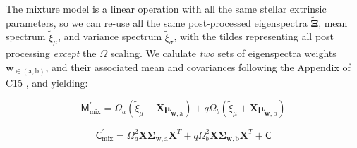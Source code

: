 \documentclass[onecolumn]{emulateapj}%
\newcommand{\iancze}{{\sc C15 }}
\begin{document}
The mixture model is a linear operation with all the same stellar extrinsic parameters, so we can re-use all the same post-processed eigenspectra $\widetilde{\mathbf{\Xi}}$, mean spectrum $\widetilde{\xi}_\mu$, and variance spectrum $\widetilde{\xi}_\sigma$, with the tildes representing all post processing \emph{except} the $\Omega$ scaling.  We calulate \emph{two} sets of eigenspectra weights $\mathbf{w}_{\in (\mathrm{a}, \mathrm{b})}$, and their associated mean and covariances following the Appendix of \iancze, and yielding:

\begin{equation}
  \mathsf{M}_{\mathrm{mix}}^\prime = \Omega_a (\widetilde{\xi}_\mu + \mathbf{X} \mathbf{\mu}_{\mathbf{w}, \mathrm{a}}) + q \Omega_b (\widetilde{\xi}_\mu + \mathbf{X} \mathbf{\mu}_{\mathbf{w}, \mathrm{b}})
\end{equation}

\begin{equation}
  \mathsf{C}_{\mathrm{mix}}^\prime = \Omega_a^2 \mathbf{X} \mathbf{\Sigma}_\mathbf{w, \mathrm{a}} \mathbf{X}^T + q \Omega_b^2 \mathbf{X} \mathbf{\Sigma}_\mathbf{w, \mathrm{b}} \mathbf{X}^T + \mathsf{C}
  \label{eqn:modC}
\end{equation}
\end{document}
